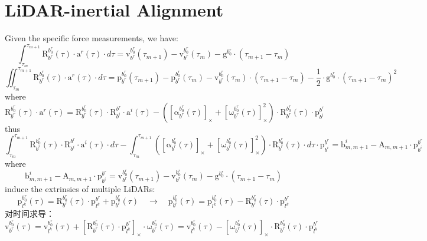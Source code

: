 \documentclass[12pt, onecolumn]{article}
\newcommand\liehat[1]{\left[ #1 \right]_\times}
\newcommand\bsm[1]{\boldsymbol{\mathrm{#1}}}
\newcommand\rotation[2]{{\bsm{R}_{#1}^{#2}}}
\newcommand\angvel[2]{{\bsm{\omega}_{#1}^{#2}}}
\newcommand\angacce[2]{{\bsm{\alpha}_{#1}^{#2}}}
\newcommand\translation[2]{{\bsm{p}_{#1}^{#2}}}
\newcommand\linvel[2]{{\bsm{v}_{#1}^{#2}}}
\newcommand\gravity[1]{{\bsm{g}^{#1}}}
\begin{document}
	\section{LiDAR-inertial Alignment}
	Given the specific force measurements, we have:
	\begin{equation}
	\int_{\tau_m}^{\tau_{m+1}}\rotation{b^r}{b^r_0}(\tau) \cdot\bsm{a}^r(\tau)\cdot d\tau
	=\linvel{b^r}{b^r_0}(\tau_{m+1})-\linvel{b^r}{b^r_0}(\tau_m)-\gravity{b^r_0}\cdot\left(\tau_{m+1}-\tau_m \right) 
	\end{equation}
	\begin{equation}
		\iint_{\tau_m}^{\tau_{m+1}}\rotation{b^r}{b^r_0}(\tau) \cdot\bsm{a}^r(\tau)\cdot d\tau
		=\translation{b^r}{b^r_0}(\tau_{m+1})-\translation{b^r}{b^r_0}(\tau_m)
		-\linvel{b^r}{b^r_0}(\tau_m)\cdot\left(\tau_{m+1}-\tau_m \right)
		-\frac{1}{2}\cdot\gravity{b^r_0}\cdot\left(\tau_{m+1}-\tau_m \right)^2
		\end{equation}
	where
	\begin{equation}
		\rotation{b^r}{b^r_0}(\tau) \cdot\bsm{a}^r(\tau)
		=\rotation{b^r}{b^r_0}(\tau) \cdot\rotation{b^i}{b^r} \cdot\bsm{a}^i(\tau) -\left(\liehat{\angacce{b^r}{b^r_0}(\tau)}+ \liehat{\angvel{b^r}{b^r_0}(\tau)}^2\right) \cdot\rotation{b^r}{b^r_0}(\tau)\cdot\translation{b^i}{b^r}
	\end{equation}
	thus
	\begin{equation}
	\int_{\tau_m}^{\tau_{m+1}}\rotation{b^r}{b^r_0}(\tau) \cdot\rotation{b^i}{b^r} \cdot\bsm{a}^i(\tau) \cdot d\tau-
	\int_{\tau_m}^{\tau_{m+1}}\left(\liehat{\angacce{b^r}{b^r_0}(\tau)}+ \liehat{\angvel{b^r}{b^r_0}(\tau)}^2\right) \cdot\rotation{b^r}{b^r_0}(\tau)\cdot d\tau\cdot\translation{b^i}{b^r}
	=\bsm{b}^i_{m,m+1}-\bsm{A}_{m,m+1}\cdot\translation{b^i}{b^r}
	\end{equation}
	where
	\begin{equation}
	\bsm{b}^i_{m,m+1}-\bsm{A}_{m,m+1}\cdot\translation{b^i}{b^r}=
	\linvel{b^r}{b^r_0}(\tau_{m+1})-\linvel{b^r}{b^r_0}(\tau_m)-\gravity{b^r_0}\cdot\left(\tau_{m+1}-\tau_m \right) 
	\end{equation}
	induce the extrinsics of multiple LiDARs:
	\begin{equation}
	\translation{l^k}{b^r_0}(\tau)=
	\rotation{b^r}{b^r_0}(\tau)\cdot\translation{l^k}{b^r}+\translation{b^r}{b^r_0}(\tau)
	\quad\to\quad
	\translation{b^r}{b^r_0}(\tau)=\translation{l^k}{b^r_0}(\tau)-\rotation{b^r}{b^r_0}(\tau)\cdot\translation{l^k}{b^r}
	\end{equation}
	对时间求导：
	\begin{equation}
	\linvel{b^r}{b^r_0}(\tau)=\linvel{l^k}{b^r_0}(\tau)+
	\liehat{\rotation{b^r}{b^r_0}(\tau)\cdot\translation{l^k}{b^r}}\cdot\angvel{b^r}{b^r_0}(\tau)
	=\linvel{l^k}{b^r_0}(\tau)-
		\liehat{\angvel{b^r}{b^r_0}(\tau)}\cdot\rotation{b^r}{b^r_0}(\tau)\cdot\translation{l^k}{b^r}
	\end{equation}
\end{document}
